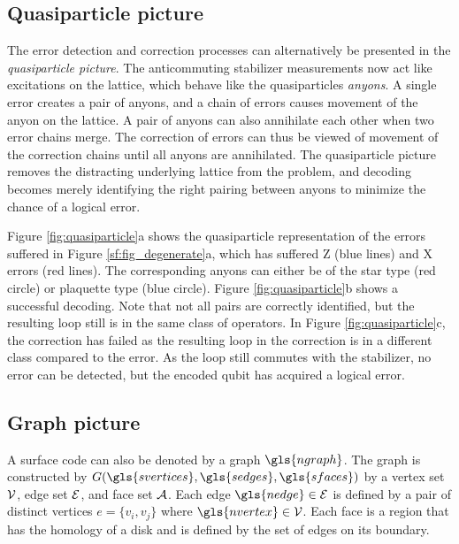 \subsection{Quasiparticle picture}\label{sec:quasiparticle}
The error detection and correction processes can alternatively be presented in the \emph{quasiparticle picture}. The anticommuting stabilizer measurements now act like excitations on the lattice, which behave like the quasiparticles \emph{anyons}. A single error creates a pair of anyons, and a chain of errors causes movement of the anyon on the lattice. A pair of anyons can also annihilate each other when two error chains merge. The correction of errors can thus be viewed of movement of the correction chains until all anyons are annihilated. The quasiparticle picture removes the distracting underlying lattice from the problem, and decoding becomes merely identifying the right pairing between anyons to minimize the chance of a logical error.


Figure \ref{fig:quasiparticle}a shows the quasiparticle representation of the errors suffered in Figure \ref{sf:fig_degenerate}a, which has suffered Z (blue lines) and X errors (red lines). The corresponding anyons can either be of the star type (red circle) or plaquette type (blue circle). Figure \ref{fig:quasiparticle}b shows a successful decoding. Note that not all pairs are correctly identified, but the resulting loop still is in the same class of operators. In Figure \ref{fig:quasiparticle}c, the correction has failed as the resulting loop in the correction is in a different class compared to the error. As the loop still commutes with the stabilizer, no error can be detected, but the encoded qubit has acquired a logical error.


\subsection{Graph picture}\label{sec:toricgraph}
A surface code can also be denoted by a graph $\gls{ngraph}$. The graph is constructed by $G(\gls{svertices}, \gls{sedges}, \gls{sfaces})$ by a vertex set $\mathcal{V}$, edge set $\mathcal{E}$, and face set $\mathcal{A}$. Each edge $\gls{nedge}\in \m{E}$ is defined by a pair of distinct vertices $e=\{v_i, v_j\}$ where $\gls{nvertex}\in \m{V}$. Each face is a region that has the homology of a disk and is defined by the set of edges on its boundary. 

